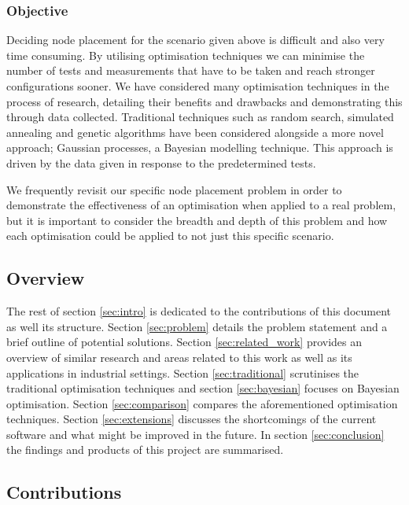 	\subsubsection{Objective}
		\label{sec:intro_objective} 
		
		Deciding node placement for the scenario given above is difficult and also very time consuming. By utilising optimisation techniques we can minimise the number of tests and measurements that have to be taken and reach stronger configurations sooner. We have considered many optimisation techniques in the process of research, detailing their benefits and drawbacks and demonstrating this through data collected. Traditional techniques such as random search, simulated annealing and genetic algorithms have been considered alongside a more novel approach; Gaussian processes, a Bayesian modelling technique\cite{rahat2020bayesian}. This approach is driven by the data given in response to the predetermined tests. 

		We frequently revisit our specific node placement problem in order to demonstrate the effectiveness of an optimisation when applied to a real problem, but it is important to consider the breadth and depth of this problem and how each optimisation could be applied to not just this specific scenario. 
		
	\subsection{Overview}  
		\label{sec:intro_overview} 
		
		The rest of section \ref{sec:intro} is dedicated to the contributions of this document as well its structure. Section \ref{sec:problem} details the problem statement and a brief outline of potential solutions. Section \ref{sec:related_work} provides an overview of similar research and areas related to this work as well as its applications in industrial settings. Section \ref{sec:traditional} scrutinises the traditional optimisation techniques and section \ref{sec:bayesian} focuses on Bayesian optimisation. Section \ref{sec:comparison} compares the aforementioned optimisation techniques. Section \ref{sec:extensions} discusses the shortcomings of the current software and what might be improved in the future. In section \ref{sec:conclusion} the findings and products of this project are summarised.
	
	\subsection{Contributions} 
		\label{sec:intro_contribs} 
		
